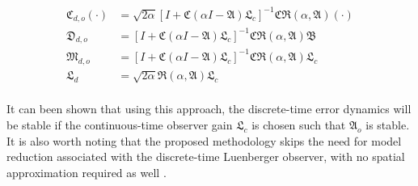 \begin{equation} \label{eq:observer_discrete_CDLM}
    \begin{aligned}
        \mathfrak{C}_{d,o} (\cdot) &= \sqrt{2\alpha} \left[ I + \mathfrak{C} (\alpha I - \mathfrak{A}) \mathfrak{L}_c \right]^{-1} \mathfrak{C} \mathfrak{R}(\alpha, \mathfrak{A}) (\cdot) \\
        \mathfrak{D}_{d,o} &= \left[ I + \mathfrak{C} (\alpha I - \mathfrak{A}) \mathfrak{L}_c \right]^{-1} \mathfrak{C} \mathfrak{R}(\alpha, \mathfrak{A}) \mathfrak{B} \\
        \mathfrak{M}_{d,o} &= \left[ I + \mathfrak{C} (\alpha I - \mathfrak{A}) \mathfrak{L}_c \right]^{-1} \mathfrak{C} \mathfrak{R}(\alpha, \mathfrak{A}) \mathfrak{L}_c \\
        \mathfrak{L}_d &= \sqrt{2\alpha} \mathfrak{R}(\alpha, \mathfrak{A}) \mathfrak{L}_c \\
    \end{aligned}
\end{equation}

It can been shown that using this approach, the discrete-time error dynamics will be stable if the continuous-time observer gain $\mathfrak{L}_c$ is chosen such that $\mathfrak{A}_o$ is stable. It is also worth noting that the proposed methodology skips the need for model reduction associated with the discrete-time Luenberger observer, with no spatial approximation required as well \cite{dochain2000state,dochain2001state,alonso2004optimal,ali2015review,khatibi2021model}.